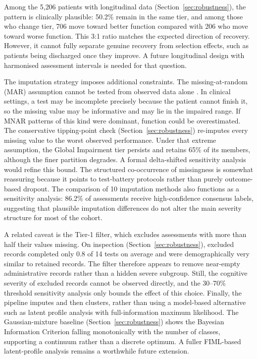 Among the 5{,}206 patients with longitudinal data (Section~\ref{sec:robustness}), the pattern is clinically plausible: 50.2\% remain in the same tier, and among those who change tier, 706 move toward better function compared with 206 who move toward worse function. This 3:1 ratio matches the expected direction of recovery. However, it cannot fully separate genuine recovery from selection effects, such as patients being discharged once they improve. A future longitudinal design with harmonised assessment intervals is needed for that question.

The imputation strategy imposes additional constraints. The missing-at-random (MAR) assumption cannot be tested from observed data alone \parencite{rubin1976inference, little2019statistical}. In clinical settings, a test may be incomplete precisely because the patient cannot finish it, so the missing value may be informative and may lie in the impaired range. If MNAR patterns of this kind were dominant, function could be overestimated. The conservative tipping-point check (Section~\ref{sec:robustness}) re-imputes every missing value to the worst observed performance. Under that extreme assumption, the Global Impairment tier persists and retains 65\% of its members, although the finer partition degrades. A formal delta-shifted sensitivity analysis would refine this bound. The structured co-occurrence of missingness is somewhat reassuring because it points to test-battery protocols rather than purely outcome-based dropout. The comparison of 10 imputation methods also functions as a sensitivity analysis: 86.2\% of assessments receive high-confidence consensus labels, suggesting that plausible imputation differences do not alter the main severity structure for most of the cohort.

A related caveat is the Tier-1 filter, which excludes assessments with more than half their values missing. On inspection (Section~\ref{sec:robustness}), excluded records completed only 0.8 of 14 tests on average and were demographically very similar to retained records. The filter therefore appears to remove near-empty administrative records rather than a hidden severe subgroup. Still, the cognitive severity of excluded records cannot be observed directly, and the 30--70\% threshold sensitivity analysis only bounds the effect of this choice. Finally, the pipeline imputes and then clusters, rather than using a model-based alternative such as latent profile analysis with full-information maximum likelihood. The Gaussian-mixture baseline (Section~\ref{sec:robustness}) shows the Bayesian Information Criterion falling monotonically with the number of classes, supporting a continuum rather than a discrete optimum. A fuller FIML-based latent-profile analysis remains a worthwhile future extension.

